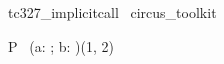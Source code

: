 
\begin{zsection}
  \SECTION\ tc327\_implicitcall \parents\ circus\_toolkit
\end{zsection}

\begin{zed}
    [NAME]
\end{zed}

\begin{circus}
    \circprocess\ P \circdef\  (a: \nat; b: \nat \circspot \circbegin \circspot \Skip \circend)(1, 2)
\end{circus}

